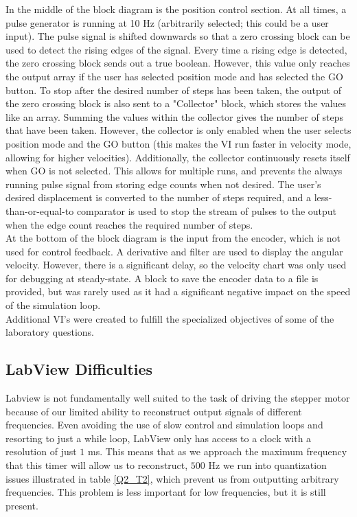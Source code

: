 \documentclass{article}
\theoremstyle{plain}
\theoremstyle{definition}
\theoremstyle{remark}
\begin{document}
In the middle of the block diagram is the position control section. At all times, a pulse generator is running at 10 Hz (arbitrarily selected; this could be a user input). The pulse signal is shifted downwards so that a zero crossing block can be used to detect the rising edges of the signal. Every time a rising edge is detected, the zero crossing block sends out a true boolean. However, this value only reaches the output array if the user has selected position mode and has selected the GO button. To stop after the desired number of steps has been taken, the output of the zero crossing block is also sent to a "Collector" block, which stores the values like an array. Summing the values within the collector gives the number of steps that have been taken. However, the collector is only enabled when the user selects position mode and the GO button (this makes the VI run faster in velocity mode, allowing for higher velocities). Additionally, the collector continuously resets itself when GO is not selected. This allows for multiple runs, and prevents the always running pulse signal from storing edge counts when not desired. The user's desired displacement is converted to the number of steps required, and a less-than-or-equal-to comparator is used to stop the stream of pulses to the output when the edge count reaches the required number of steps.\\

At the bottom of the block diagram is the input from the encoder, which is not used for control feedback. A derivative and filter are used to display the angular velocity. However, there is a significant delay, so the velocity chart was only used for debugging at steady-state. A block to save the encoder data to a file is provided, but was rarely used as it had a significant negative impact on the speed of the simulation loop.   \\


Additional VI's were created to fulfill the specialized objectives of some of the laboratory questions.\\

\subsection*{LabView Difficulties}

Labview is not fundamentally well suited to the task of driving the stepper motor because of our limited ability to reconstruct output signals of different frequencies.  Even avoiding the use of slow control and simulation loops and resorting to just a while loop, LabView only has access to a clock with a resolution of just $1$ ms.  This means that as we approach the maximum frequency that this timer will allow us to reconstruct, $500$ Hz we run into quantization issues illustrated in table \ref{Q2_T2}, which prevent us from outputting arbitrary frequencies.  This problem is less important for low frequencies, but it is still present.  
\end{document}
